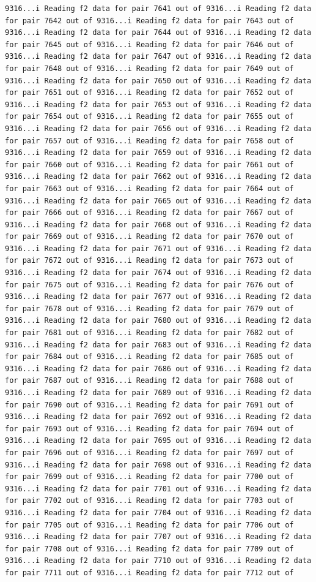 \documentclass[
]{article}
\begin{document}
\begin{verbatim}
9316...i Reading f2 data for pair 7641 out of 9316...i Reading f2 data for pair 7642 out of 9316...i Reading f2 data for pair 7643 out of 9316...i Reading f2 data for pair 7644 out of 9316...i Reading f2 data for pair 7645 out of 9316...i Reading f2 data for pair 7646 out of 9316...i Reading f2 data for pair 7647 out of 9316...i Reading f2 data for pair 7648 out of 9316...i Reading f2 data for pair 7649 out of 9316...i Reading f2 data for pair 7650 out of 9316...i Reading f2 data for pair 7651 out of 9316...i Reading f2 data for pair 7652 out of 9316...i Reading f2 data for pair 7653 out of 9316...i Reading f2 data for pair 7654 out of 9316...i Reading f2 data for pair 7655 out of 9316...i Reading f2 data for pair 7656 out of 9316...i Reading f2 data for pair 7657 out of 9316...i Reading f2 data for pair 7658 out of 9316...i Reading f2 data for pair 7659 out of 9316...i Reading f2 data for pair 7660 out of 9316...i Reading f2 data for pair 7661 out of 9316...i Reading f2 data for pair 7662 out of 9316...i Reading f2 data for pair 7663 out of 9316...i Reading f2 data for pair 7664 out of 9316...i Reading f2 data for pair 7665 out of 9316...i Reading f2 data for pair 7666 out of 9316...i Reading f2 data for pair 7667 out of 9316...i Reading f2 data for pair 7668 out of 9316...i Reading f2 data for pair 7669 out of 9316...i Reading f2 data for pair 7670 out of 9316...i Reading f2 data for pair 7671 out of 9316...i Reading f2 data for pair 7672 out of 9316...i Reading f2 data for pair 7673 out of 9316...i Reading f2 data for pair 7674 out of 9316...i Reading f2 data for pair 7675 out of 9316...i Reading f2 data for pair 7676 out of 9316...i Reading f2 data for pair 7677 out of 9316...i Reading f2 data for pair 7678 out of 9316...i Reading f2 data for pair 7679 out of 9316...i Reading f2 data for pair 7680 out of 9316...i Reading f2 data for pair 7681 out of 9316...i Reading f2 data for pair 7682 out of 9316...i Reading f2 data for pair 7683 out of 9316...i Reading f2 data for pair 7684 out of 9316...i Reading f2 data for pair 7685 out of 9316...i Reading f2 data for pair 7686 out of 9316...i Reading f2 data for pair 7687 out of 9316...i Reading f2 data for pair 7688 out of 9316...i Reading f2 data for pair 7689 out of 9316...i Reading f2 data for pair 7690 out of 9316...i Reading f2 data for pair 7691 out of 9316...i Reading f2 data for pair 7692 out of 9316...i Reading f2 data for pair 7693 out of 9316...i Reading f2 data for pair 7694 out of 9316...i Reading f2 data for pair 7695 out of 9316...i Reading f2 data for pair 7696 out of 9316...i Reading f2 data for pair 7697 out of 9316...i Reading f2 data for pair 7698 out of 9316...i Reading f2 data for pair 7699 out of 9316...i Reading f2 data for pair 7700 out of 9316...i Reading f2 data for pair 7701 out of 9316...i Reading f2 data for pair 7702 out of 9316...i Reading f2 data for pair 7703 out of 9316...i Reading f2 data for pair 7704 out of 9316...i Reading f2 data for pair 7705 out of 9316...i Reading f2 data for pair 7706 out of 9316...i Reading f2 data for pair 7707 out of 9316...i Reading f2 data for pair 7708 out of 9316...i Reading f2 data for pair 7709 out of 9316...i Reading f2 data for pair 7710 out of 9316...i Reading f2 data for pair 7711 out of 9316...i Reading f2 data for pair 7712 out of 
\end{verbatim}
\end{document}
